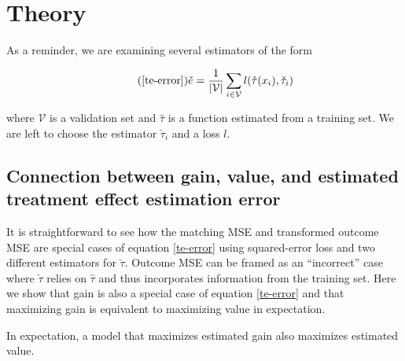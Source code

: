 \section{Theory}
\label{theory}

As a reminder, we are examining several estimators of the form

\begin{equation}
\tag{\ref{te-error}}
\check e = \frac{1}{|\mathcal{V}|}\sum_{i \in \mathcal{V}} l(\hat \tau (x_i), \check \tau_i)
\end{equation}

where $\mathcal V$ is a validation set and $\hat\tau$ is a function estimated from a training set. We are left to choose the estimator $\check\tau_i$ and a loss $l$.

\subsection{Connection between gain, value, and estimated treatment effect estimation error}
\label{sec:gain-value}

It is straightforward to see how the matching MSE and transformed outcome MSE are special cases of equation \ref{te-error} using squared-error loss and two different estimators for $\check\tau$. Outcome MSE can be framed as an ``incorrect'' case where $\check\tau$ relies on $\hat\tau$ and thus incorporates information from the training set. Here we show that gain is also a special case of equation \ref{te-error} and that maximizing gain is equivalent to maximizing value in expectation.

\begin{theorem}
\label{gain-value}
In expectation, a model that maximizes estimated gain also maximizes estimated value.
\end{theorem}

